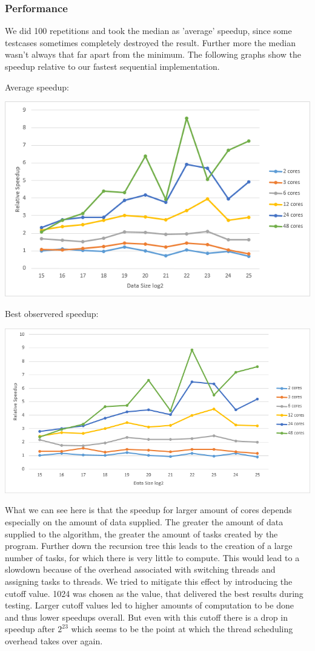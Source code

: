 \subsubsection{Performance}
We did 100 repetitions and took the median as 'average' speedup, since some testcases sometimes completely destroyed the result. Further more the median wasn't always that far apart from the minimum.\newline 
The following graphs show the speedup relative to our fastest sequential implementation.

Average speedup:

\includegraphics[width=\textwidth]{omp_rec_avg.png}

\pagebreak
Best observered speedup:

\includegraphics[width=\textwidth]{omp_rec_best.png}

What we can see here is that the speedup for larger amount of cores depends especially on the amount of data supplied.
The greater the amount of data supplied to the algorithm, the greater the amount of tasks created by the program. Further down the recursion tree this leads to the creation of
a large number of tasks, for which there is very little to compute. This would lead to a slowdown because of the overhead associated with switching threads and assigning tasks to threads.
We tried to mitigate this effect by introducing the cutoff value. 1024 was chosen as the value, that delivered the best results during testing. Larger cutoff values led to higher amounts of computation to be done and thus lower speedups overall.
But even with this cutoff there is a drop in speedup after \(2^{23}\) which seems to be the point at which the thread scheduling overhead takes over again.

